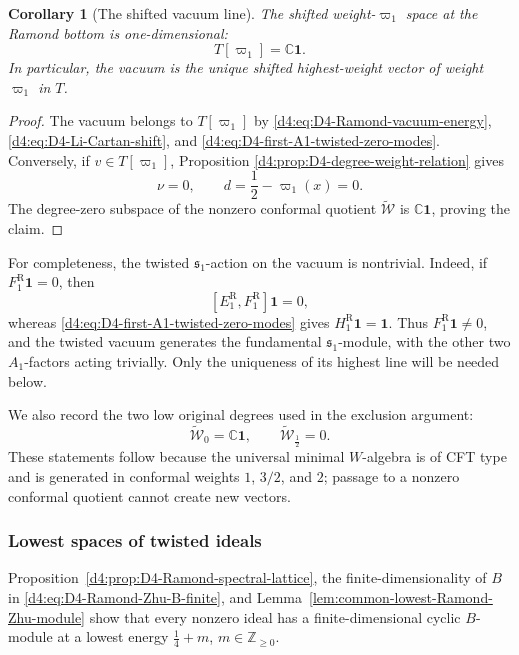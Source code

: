 \documentclass[11pt,reqno]{amsart}
\newtheorem{corollary}[theorem]{Corollary}
\theoremstyle{definition}
\theoremstyle{remark}
\begin{document}
\begin{corollary}[The shifted vacuum line]
\label{d4:cor:D4-shifted-vacuum-line}
The shifted weight-\(\varpi_1\) space at the Ramond bottom is
one-dimensional:
\begin{equation*}
  T[\varpi_1]=\mathbb C\mathbf1.
\end{equation*}
In particular, the vacuum is the unique shifted highest-weight vector
of weight \(\varpi_1\) in \(T\).
\end{corollary}

\begin{proof}
The vacuum belongs to \(T[\varpi_1]\) by
\eqref{d4:eq:D4-Ramond-vacuum-energy},
\eqref{d4:eq:D4-Li-Cartan-shift}, and
\eqref{d4:eq:D4-first-A1-twisted-zero-modes}.  Conversely, if
\(v\in T[\varpi_1]\), Proposition
\ref{d4:prop:D4-degree-weight-relation} gives
\[
  \nu=0,
  \qquad
  d=\frac12-\varpi_1(x)=0.
\]
The degree-zero subspace of the nonzero conformal quotient
\(\widetilde{\mathcal W}\) is \(\mathbb C\mathbf1\), proving the claim.
\end{proof}

For completeness, the twisted \(\mathfrak s_1\)-action on the vacuum is
nontrivial.  Indeed, if
\(F_1^{\mathrm R}\mathbf1=0\), then
\[
  [E_1^{\mathrm R},F_1^{\mathrm R}]\mathbf1=0,
\]
whereas \eqref{d4:eq:D4-first-A1-twisted-zero-modes} gives
\(H_1^{\mathrm R}\mathbf1=\mathbf1\).  Thus
\(F_1^{\mathrm R}\mathbf1\ne0\), and the twisted vacuum generates the
fundamental \(\mathfrak s_1\)-module, with the other two
\(A_1\)-factors acting trivially.  Only the uniqueness of its highest
line will be needed below.

We also record the two low original degrees used in the exclusion
argument:
\begin{equation}
  \widetilde{\mathcal W}_0=\mathbb C\mathbf1,
  \qquad
  \widetilde{\mathcal W}_{\frac12}=0.
  \label{d4:eq:D4-low-original-conformal-degrees}
\end{equation}
These statements follow because the universal minimal \(W\)-algebra is
of CFT type and is generated in conformal weights \(1\), \(3/2\), and
\(2\); passage to a nonzero conformal quotient cannot create new
vectors.

\subsubsection{Lowest spaces of twisted ideals}


Proposition~\ref{d4:prop:D4-Ramond-spectral-lattice}, the finite-dimensionality
of $B$ in \eqref{d4:eq:D4-Ramond-Zhu-B-finite}, and
Lemma~\ref{lem:common-lowest-Ramond-Zhu-module} show that every nonzero ideal
has a finite-dimensional cyclic $B$-module at a lowest energy
$\frac14+m$, $m\in\mathbb Z_{\ge0}$.
\end{document}
